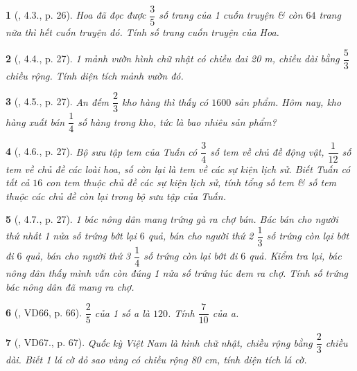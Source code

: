 \documentclass{article}
\newtheorem{baitoan}{}
\begin{document}
\begin{baitoan}[\cite{Binh_boi_duong_Toan_6_tap_2}, 4.3., p. 26]
	Hoa đã đọc được $\dfrac{3}{5}$ số trang của 1 cuốn truyện \& còn $64$ trang nữa thì hết cuốn truyện đó. Tính số trang cuốn truyện của Hoa.
\end{baitoan}

\begin{baitoan}[\cite{Binh_boi_duong_Toan_6_tap_2}, 4.4., p. 27]
	1 mảnh vườn hình chữ nhật có chiều dai {\rm20 m}, chiều dài bằng $\dfrac{5}{3}$ chiều rộng. Tính diện tích mảnh vườn đó.
\end{baitoan}

\begin{baitoan}[\cite{Binh_boi_duong_Toan_6_tap_2}, 4.5., p. 27]
	An đếm $\dfrac{2}{3}$ kho hàng thì thấy có $1600$ sản phẩm. Hôm nay, kho hàng xuất bán $\dfrac{1}{4}$ số hàng trong kho, tức là bao nhiêu sản phẩm?
\end{baitoan}

\begin{baitoan}[\cite{Binh_boi_duong_Toan_6_tap_2}, 4.6., p. 27]
	Bộ sưu tập tem của Tuấn có $\dfrac{3}{4}$ số tem về chủ đề động vật, $\dfrac{1}{12}$ số tem về chủ đề các loài hoa, số còn lại là tem về các sự kiện lịch sử. Biết Tuấn có tất cả $16$ con tem thuộc chủ đề các sự kiện lịch sử, tính tổng số tem \& số tem thuộc các chủ đề còn lại trong bộ sưu tập của Tuấn.
\end{baitoan}

\begin{baitoan}[\cite{Binh_boi_duong_Toan_6_tap_2}, 4.7., p. 27]
	1 bác nông dân mang trứng gà ra chợ bán. Bác bán cho người thứ nhất 1 nửa số trứng bớt lại $6$ quả, bán cho người thứ 2 $\dfrac{1}{3}$ số trứng còn lại bớt đi $6$ quả, bán cho người thứ 3 $\dfrac{1}{4}$ số trứng còn lại bớt đi $6$ quả. Kiểm tra lại, bác nông dân thấy mình vẫn còn đúng 1 nửa số trứng lúc đem ra chợ. Tính số trứng bác nông dân đã mang ra chợ.
\end{baitoan}

\begin{baitoan}[\cite{Tuyen_Toan_6}, VD66, p. 66]
	$\dfrac{2}{5}$ của 1 số a là $120$. Tính $\dfrac{7}{10}$ của a.
\end{baitoan}

\begin{baitoan}[\cite{Tuyen_Toan_6}, VD67., p. 67]
	Quốc kỳ Việt Nam là hình chữ nhật, chiều rộng bằng $\dfrac{2}{3}$ chiều dài. Biết 1 lá cờ đỏ sao vàng có chiều rộng {\rm80 cm}, tính diện tích lá cờ.
\end{baitoan}
\end{document}
